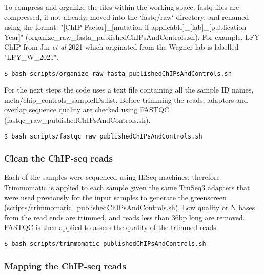 \documentclass{article}
\begin{document}
\begin{sloppypar}
To compress and organize the files within the working space, fastq files are compressed, if not already, moved into the `fastq/raw` directory, and renamed using the format: "[ChIP Factor]\_[mutation if applicable]\_[lab]\_[publication Year]" ({\selectfont organize\_raw\_fasta\_publishedChIPsAndControls.sh}). For example, LFY ChIP from Jin \emph{et al} 2021 which originated from the Wagner lab is labelled "LFY\_W\_2021". 

\begin{verbatim}
$ bash scripts/organize_raw_fasta_publishedChIPsAndControls.sh
\end{verbatim}

For the next steps the code uses a text file containing all the sample ID names, {\selectfont meta/chip\_controls\_sampleIDs.list}. Before trimming the reads, adapters and overlap sequence quality are checked using FASTQC ({\selectfont fastqc\_raw\_publishedChIPsAndControls.sh}).

\begin{verbatim}
$ bash scripts/fastqc_raw_publishedChIPsAndControls.sh
\end{verbatim}

\subsubsection{Clean the ChIP-seq reads}

Each of the samples were sequenced using HiSeq machines, therefore Trimmomatic is applied to each sample given the same TruSeq3 adapters that were used previously for the input samples to generate the greenscreen ({\selectfont scripts/trimmomatic\_publishedChIPsAndControls.sh}). Low quality or N bases from the read ends are trimmed, and reads less than 36bp long are removed. FASTQC is then applied to assess the quality of the trimmed reads.

\begin{verbatim}
$ bash scripts/trimmomatic_publishedChIPsAndControls.sh
\end{verbatim}

\subsubsection{Mapping the ChIP-seq reads}


\end{sloppypar}
\end{document}
